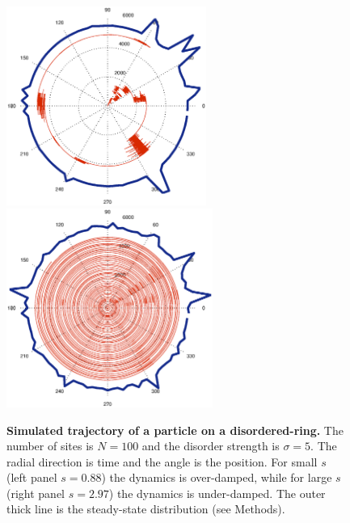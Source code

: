 \documentclass[aps,pre,floats,floatfix,twocolumn]{revtex4}
\newcommand{\Ap}[1]{\textcolor{blue}{{appendix}\!~(\ref{#1})}}
\begin{document}
\begin{figure}
\includegraphics[height=6.5cm]{polar_1_a} \ \ \ \ \ \ \ \  \ \ \ \ \ \ \ \ 
\includegraphics[height=6.5cm]{polar_2_a}

\caption{\label{traj}
{\bf Simulated trajectory of a particle on a disordered-ring.}
The number of sites is $N{=}100$ and the disorder strength is $\sigma{=}5$.
The radial direction is time and the angle is the position. 
For small $s$ (left panel $s{=}0.88$) the dynamics is over-damped, 
while for large $s$ (right panel $s{=}2.97$) the dynamics is under-damped. 
The outer thick line is the steady-state distribution (see Methods). 
}
\end{figure}
\end{document}
